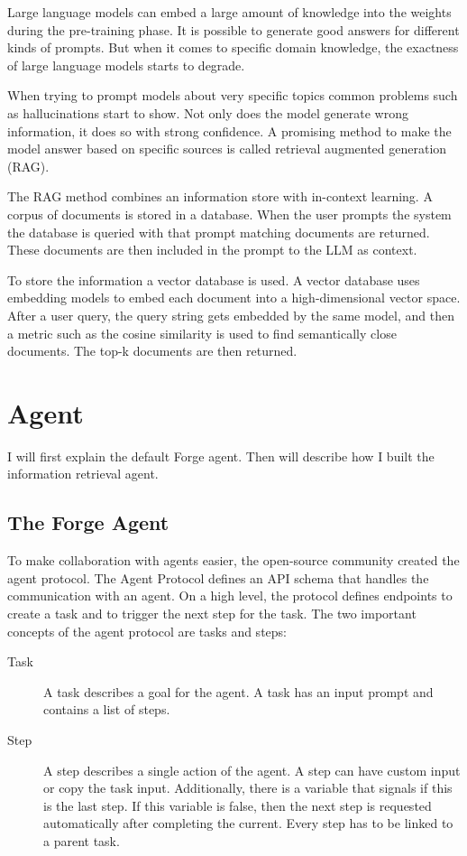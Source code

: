 \documentclass[../main.tex]{subfiles}
\begin{document}
Large language models can embed a large amount of knowledge into the weights during the pre-training phase.
It is possible to generate good answers for different kinds of prompts.
But when it comes to specific domain knowledge, the exactness of large language models starts to degrade.

When trying to prompt models about very specific topics common problems such as hallucinations start to show.
Not only does the model generate wrong information, it does so with strong confidence.
A promising method to make the model answer based on specific sources is called retrieval augmented generation (RAG).

The RAG method combines an information store with in-context learning.
A corpus of documents is stored in a database.
When the user prompts the system the database is queried with that prompt matching documents are returned.
These documents are then included in the prompt to the LLM as context.

To store the information a vector database is used.
A vector database uses embedding models to embed each document into a high-dimensional vector space.
After a user query, the query string gets embedded by the same model,
and then a metric such as the cosine similarity is used to find semantically close documents.
The top-k documents are then returned.

\section{Agent}

I will first explain the default Forge agent.
Then will describe how I built the information retrieval agent.

\subsection{The Forge Agent}

To make collaboration with agents easier, the open-source community created the agent protocol.
The Agent Protocol defines an API schema that handles the communication with an agent.
On a high level, the protocol defines endpoints to create a task and to trigger the next step for the task.
The two important concepts of the agent protocol are tasks and steps:

\begin{description}
      \item[Task] A task describes a goal for the agent.
            A task has an input prompt and contains a list of steps.
      \item[Step] A step describes a single action of the agent.
            A step can have custom input or copy the task input.
            Additionally, there is a variable that signals if this is the last step.
            If this variable is false, then the next step is requested automatically after completing the current.
            Every step has to be linked to a parent task.
\end{description}
\end{document}
